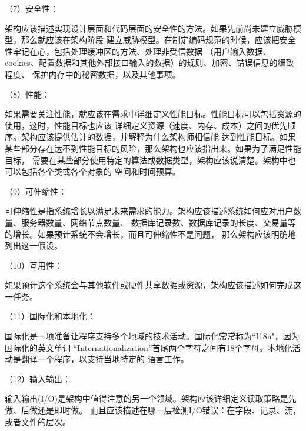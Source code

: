 \documentclass{article}
\begin{document}
\par
（7）安全性：
\par
架构应该描述实现设计层面和代码层面的安全性的方法。如果先前尚未建立威胁模型，那么就应该在架构阶段
建立威胁模型。在制定编码规范的时候，应该把安全性牢记在心，包括处理缓冲区的方法、处理非受信数据
（用户输入数据、cookies、配置数据和其他外部接口输入的数据）的规则、加密、错误信息的细致程度、
保护内存中的秘密数据，以及其他事项。

\par
（8）性能：
\par
如果需要关注性能，就应该在需求中详细定义性能目标。性能目标可以包括资源的使用，这时，性能目标也应该
详细定义资源（速度、内存、成本）之间的优先顺序。架构应该提供估计的数据，并解释为什么架构师相信能
达到性能目标。如果某些部分存在达不到性能目标的风险，那么架构也应该指出来。如果为了满足性能目标，
需要在某些部分使用特定的算法或数据类型，架构应该说清楚。架构中也可以包括各个类或各个对象的
空间和时间预算。

\par
（9）可伸缩性：
\par
可伸缩性是指系统增长以满足未来需求的能力。架构应该描述系统如何应对用户数量、服务器数量、网络节点数量、
数据库记录数、数据库记录的长度、交易量等的增长。如果预计系统不会增长，而且可伸缩性不是问题，
那么架构应该明确地列出这一假设。

\par
（10）互用性：
\par
如果预计这个系统会与其他软件或硬件共享数据或资源，架构应该描述如何完成这一任务。

\par
（11）国际化和本地化：
\par
国际化是一项准备让程序支持多个地域的技术活动。国际化常常称为“I18n"，因为国际化的英文单词
“Internationalization”首尾两个字符之间有18个字母。本地化活动是翻译一个程序，以支持当地特定的
语言工作。

\par
（12）输入输出：
\par
输入输出(I/O)是架构中值得注意的另一个领域。架构应该详细定义读取策略是先做、后做还是即时做。
而且应该描述在哪一层检测I/O错误：在字段、记录、流，或者文件的层次。
\end{document}

